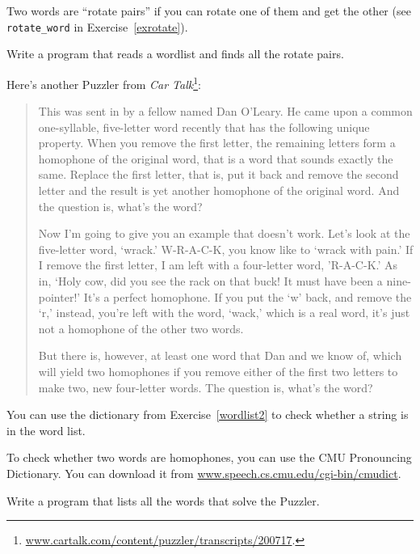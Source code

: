 \documentclass[10pt]{book}
\begin{document}
{\begin{ex}

Two words are ``rotate pairs'' if you can rotate one of them
and get the other (see \verb"rotate_word" in Exercise~\ref{exrotate}).

Write a program that reads a wordlist and finds all the rotate
pairs.
\end{ex}


\begin{ex}

Here's another Puzzler from {\em Car
Talk}\footnote{\url{www.cartalk.com/content/puzzler/transcripts/200717}.}:

\begin{quote}
This was sent in by a fellow named Dan O'Leary. He came upon a common
one-syllable, five-letter word recently that has the following unique
property. When you remove the first letter, the remaining letters form
a homophone of the original word, that is a word that sounds exactly
the same. Replace the first letter, that is, put it back and remove
the second letter and the result is yet another homophone of the
original word. And the question is, what's the word?

Now I'm going to give you an example that doesn't work. Let's look at
the five-letter word, `wrack.' W-R-A-C-K, you know like to `wrack with
pain.' If I remove the first letter, I am left with a four-letter
word, 'R-A-C-K.' As in, `Holy cow, did you see the rack on that buck!
It must have been a nine-pointer!' It's a perfect homophone. If you
put the `w' back, and remove the `r,' instead, you're left with the
word, `wack,' which is a real word, it's just not a homophone of the
other two words.

But there is, however, at least one word that Dan and we know of,
which will yield two homophones if you remove either of the first two
letters to make two, new four-letter words. The question is, what's
the word?
\end{quote}


You can use the dictionary from Exercise~\ref{wordlist2} to check
whether a string is in the word list.

To check whether two words are homophones, you can use the CMU
Pronouncing Dictionary.  You can download it from
\url{www.speech.cs.cmu.edu/cgi-bin/cmudict}.

Write a program that lists all the words that solve the Puzzler.


\end{ex}}
\end{document}
